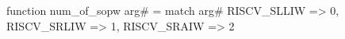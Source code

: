 function num_of_sopw arg# = match arg# {
  RISCV_SLLIW => 0,
  RISCV_SRLIW => 1,
  RISCV_SRAIW => 2
}
